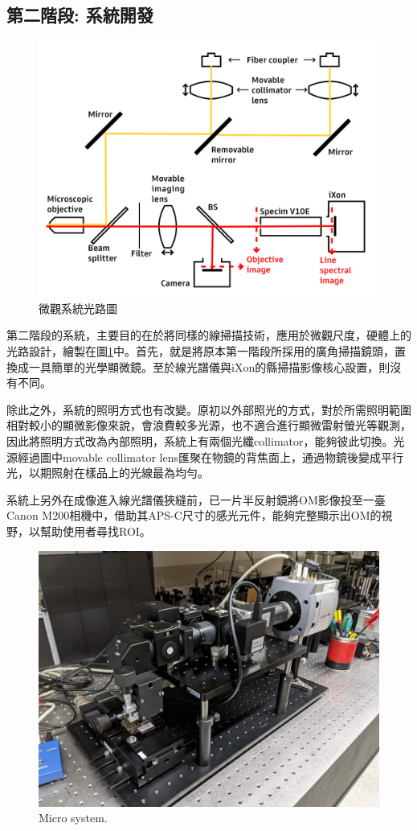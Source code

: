 \documentclass[12pt]{article}
\begin{document}
\subsection{第二階段: 系統開發}
\begin{figure}
    \centering
    \includegraphics[width = 0.9\linewidth]{lightPath2.jpg}
    \caption{微觀系統光路圖}
    \label{fig: micro path}
\end{figure}
第二階段的系統，主要目的在於將同樣的線掃描技術，應用於微觀尺度，硬體上的光路設計，繪製在圖\ref{fig: micro path}中。首先，就是將原本第一階段所採用的廣角掃描鏡頭，置換成一具簡單的光學顯微鏡。至於線光譜儀與iXon的縣掃描影像核心設置，則沒有不同。

除此之外，系統的照明方式也有改變。原初以外部照光的方式，對於所需照明範圍相對較小的顯微影像來說，會浪費較多光源，也不適合進行顯微雷射螢光等觀測，
因此將照明方式改為內部照明，系統上有兩個光纖collimator，能夠彼此切換。光源經過圖中movable collimator lens匯聚在物鏡的背焦面上，通過物鏡後變成平行光，以期照射在樣品上的光線最為均勻。

系統上另外在成像進入線光譜儀狹縫前，已一片半反射鏡將OM影像投至一臺Canon M200相機中，借助其APS-C尺寸的感光元件，能夠完整顯示出OM的視野，以幫助使用者尋找ROI。
\begin{figure}
    \centering
    \includegraphics[width=\linewidth]{microSystemPixel3.jpg}
    \caption{Micro system.}
\end{figure}
\end{document}
